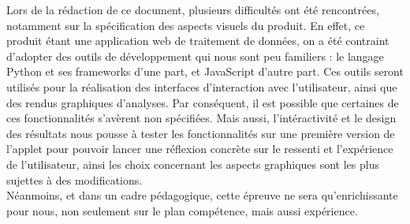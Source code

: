 		Lors de la rédaction de ce document, plusieurs difficultés ont été rencontrées, notamment sur la spécification des aspects visuels du produit. En effet, ce produit étant une application web de traitement de données, on a été contraint d'adopter des outils de développement qui nous sont peu familiers : le langage Python et ses frameworks d'une part, et JavaScript d'autre part. Ces outils seront utilisés pour la réalisation des interfaces d'interaction avec l'utilisateur, ainsi que des rendus graphiques d'analyses. Par conséquent, il est possible que certaines de ces fonctionnalités s'avèrent non spécifiées. Mais aussi, l'intéractivité et le design des résultats nous pousse à tester les fonctionnalités sur une première version de l'applet pour pouvoir lancer une réflexion concrète sur le ressenti et l'expérience de l'utilisateur, ainsi les choix concernant les aspects graphiques sont les plus sujettes à des modifications.\\
		Néanmoins, et dans un cadre pédagogique, cette épreuve ne sera qu'enrichissante pour nous, non seulement sur le plan compétence, mais aussi expérience.
		

